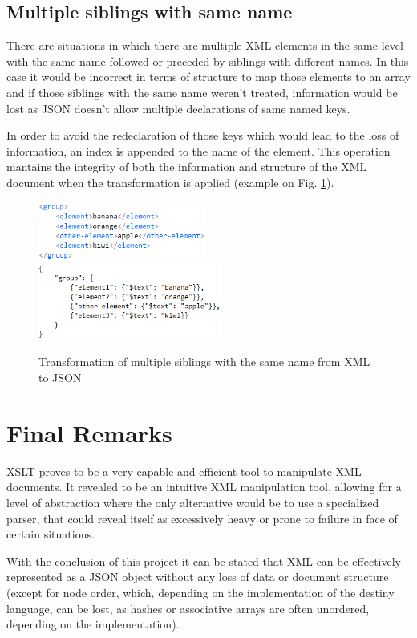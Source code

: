 \documentclass[twocolumn,twoside,10pt,a4paper]{article}
\begin{document}
\subsection{Multiple siblings with same name}
There are situations in which there are multiple XML elements in the same level with the same name followed or preceded by siblings with different names. In this case it would be incorrect in terms of structure to map those elements to an array and if those siblings with the same name weren't treated, information would be lost as JSON doesn't allow multiple declarations of same named keys.

In order to avoid the redeclaration of those keys which would lead to the loss of information, an index is appended to the name of the element. This operation mantains the integrity of both the information and structure of the XML document when the transformation is applied (example on Fig. \ref{fig:group_xml2json}).

\begin{figure}[h]
\centering
\includegraphics[width=55mm]{images/group_xml.jpg}
\includegraphics[width=60mm]{images/group_json.jpg}
\caption{Transformation of multiple siblings with the same name from XML to JSON}
\label{fig:group_xml2json}
\end{figure}

\section{Final Remarks}\label{sec:final-remarks}

XSLT proves to be a very capable and efficient tool to manipulate XML documents. It revealed to be an intuitive XML manipulation tool, allowing for a level of abstraction where the only alternative would be to use a specialized parser, that could reveal itself as excessively heavy or prone to failure in face of certain situations.

With the conclusion of this project it can be stated that XML can be effectively represented as a JSON object without any loss of data or document structure (except for node order, which, depending on the implementation of the destiny language, can be lost, as hashes or associative arrays are often unordered, depending on the implementation).
\end{document}
